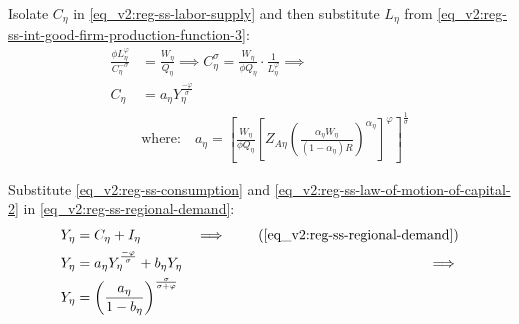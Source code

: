 \documentclass[../thesis.tex]{subfiles}
\begin{document}
	
	Isolate $C_{\eta}$ in \ref{eq_v2:reg-ss-labor-supply} and then substitute $L_{\eta}$ from \ref{eq_v2:reg-ss-int-good-firm-production-function-3}:
	\begin{align}
		\frac{\phi L_{\eta}^{\varphi}}{C_{\eta}^{-\sigma}} &= \frac{W_{\eta}}{Q_{\eta}} \implies C_{\eta}^{\sigma} = \frac{W_{\eta}}{\phi Q_{\eta}} \cdot \frac{1}{L_{\eta}^{\varphi}} \implies \nonumber\\
		C_{\eta} &= a_{\eta} Y_{\eta}^{\frac{-\varphi}{\sigma}} \label{eq_v2:reg-ss-consumption} \\
		& \text{where:} \quad a_{\eta} = \left[ \frac{W_{\eta}}{\phi Q_{\eta}} \left[ Z_{A\eta} \left( \frac{\alpha_{\eta} W_{\eta}}{(1 - \alpha_{\eta}) R} \right)^{\alpha_{\eta}} \right]^{\varphi} \right]^{\frac{1}{\sigma}}  \label{eq_v2:reg-ss-a-eta}
	\end{align}


Substitute \ref{eq_v2:reg-ss-consumption} and \ref{eq_v2:reg-ss-law-of-motion-of-capital-2} in \ref{eq_v2:reg-ss-regional-demand}:
\begin{alignat}{2}
	Y_{\eta} &= C_{\eta} + I_{\eta} &\implies \tag{\ref{eq_v2:reg-ss-regional-demand}} \\
	Y_{\eta} &= a_{\eta} Y_{\eta}^{\frac{-\varphi}{\sigma}} + b_{\eta} Y_{\eta} &\implies \nonumber \\
	Y_{\eta} &= \left( \frac{a_{\eta}}{1 - b_{\eta}} \right)^{\frac{\sigma}{\sigma + \varphi}} \label{eq_v2:reg-ss-yn}
\end{alignat}


\begin{comment}
	
	Substitute \ref{eq_v2:reg-ss-int-good-firm-FOC-Kt-2} in \ref{eq_v2:reg-ss-law-of-motion-for-capital}:
	\begin{align}
		I_{\eta} &= \delta K_{\eta} \implies I_{\eta} = \delta {\alpha_{\eta}} \frac{\Lambda_{}}{R_K} Y_{\eta} \implies \tag{\ref{eq_v2:reg-ss-law-of-motion-for-capital}} \\
		I_{\eta} &= b_{\eta} Y_{\eta} \label{eq_v2:reg-ss-investment} \\
		& \text{where:} \quad b_{\eta} = \delta {\alpha_{\eta}} \frac{\Lambda_{}}{R_K} \label{eq_v2:reg-ss-b-eta}
	\end{align}
	
\end{comment}
\end{document}
